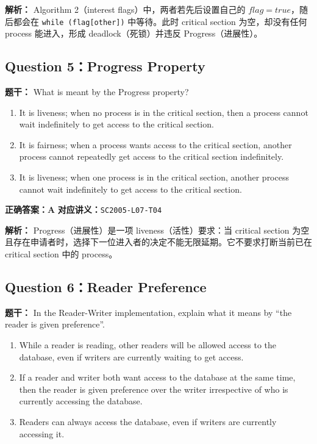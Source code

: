 \documentclass[11pt,a4paper,fontset=fandol]{ctexart}
\renewcommand{\exercisequestion}[2]{%
  \Needspace{5\baselineskip}%
  \subsection{#2}\label{exercise:#1}%
}
\renewenvironment{checkedsolution}
  {\par\nopagebreak[4]\textbf{解析：}\ignorespaces}
  {\par}
\begin{document}
\begin{checkedsolution}
Algorithm 2（interest flags）中，两者若先后设置自己的 $flag=true$，随后都会在 \texttt{while (flag[other])} 中等待。此时 critical section 为空，却没有任何 process 能进入，形成 deadlock（死锁）并违反 Progress（进展性）。
\end{checkedsolution}

\exercisequestion{SC2005-HW03-Q05}{Question 5：Progress Property}

\textbf{题干：} What is meant by the Progress property?

\begin{enumerate}[label=\Alph*.,leftmargin=2.4em]
  \item It is liveness; when no process is in the critical section, then a process cannot wait indefinitely to get access to the critical section.
  \item It is fairness; when a process wants access to the critical section, another process cannot repeatedly get access to the critical section indefinitely.
  \item It is liveness; when one process is in the critical section, another process cannot wait indefinitely to get access to the critical section.
\end{enumerate}

\textbf{正确答案：A}\qquad
\textbf{对应讲义：}\texttt{SC2005-L07-T04}

\begin{checkedsolution}
Progress（进展性）是一项 liveness（活性）要求：当 critical section 为空且存在申请者时，选择下一位进入者的决定不能无限延期。它不要求打断当前已在 critical section 中的 process。
\end{checkedsolution}

\exercisequestion{SC2005-HW03-Q06}{Question 6：Reader Preference}

\textbf{题干：} In the Reader-Writer implementation, explain what it means by ``the reader is given preference''.

\begin{enumerate}[label=\Alph*.,leftmargin=2.4em]
  \item While a reader is reading, other readers will be allowed access to the database, even if writers are currently waiting to get access.
  \item If a reader and writer both want access to the database at the same time, then the reader is given preference over the writer irrespective of who is currently accessing the database.
  \item Readers can always access the database, even if writers are currently accessing it.
\end{enumerate}
\end{document}
